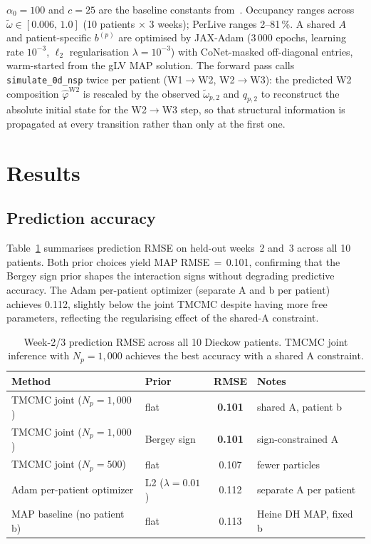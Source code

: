 \documentclass[11pt,a4paper]{article}
\begin{document}
$\alpha_0=100$ and $c=25$ are the baseline constants from~\cite{NishiokaTMCMC2025}.
Occupancy ranges across $\tilde\omega\in[0.006,\,1.0]$ (10 patients $\times$ 3 weeks); PerLive ranges 2--81\,\%.
A shared $A$ and patient-specific $b^{(p)}$ are optimised by JAX-Adam ($3\,000$ epochs, learning rate $10^{-3}$, $\ell_2$ regularisation $\lambda=10^{-3}$) with CoNet-masked off-diagonal entries, warm-started from the gLV MAP solution.
The forward pass calls \texttt{simulate\_0d\_nsp} twice per patient (W1$\to$W2, W2$\to$W3): the predicted W2 composition $\hat\varphi^{\mathrm{W2}}$ is rescaled by the observed $\tilde\omega_{p,2}$ and $q_{p,2}$ to reconstruct the absolute initial state for the W2$\to$W3 step, so that structural information is propagated at every transition rather than only at the first one.

\section{Results}
\label{sec:results}

\subsection{Prediction accuracy}

Table~\ref{tab:rmse} summarises prediction RMSE on held-out weeks~2 and~3 across all 10 patients.
Both prior choices yield MAP RMSE\,$=\,$0.101, confirming that the Bergey sign prior shapes the interaction signs without degrading predictive accuracy.
The Adam per-patient optimizer (separate A and b per patient) achieves 0.112, slightly below the joint TMCMC despite having more free parameters, reflecting the regularising effect of the shared-A constraint.

\begin{table}[htbp]
\centering\small
\begin{tabular}{@{}llcl@{}}
\toprule
\textbf{Method} & \textbf{Prior} & \textbf{RMSE} & \textbf{Notes}\\
\midrule
TMCMC joint ($N_p\!=\!1{,}000$) & flat   & \textbf{0.101} & shared A, patient b\\
TMCMC joint ($N_p\!=\!1{,}000$) & Bergey sign & \textbf{0.101} & sign-constrained A\\
TMCMC joint ($N_p\!=\!500$)  & flat   & 0.107 & fewer particles\\
Adam per-patient optimizer    & L2 ($\lambda=0.01$) & 0.112 & separate A per patient\\
MAP baseline (no patient b)   & flat   & 0.113 & Heine DH MAP, fixed b\\
\bottomrule
\end{tabular}
\caption{Week-2/3 prediction RMSE across all 10 Dieckow patients. TMCMC joint
inference with $N_p=1{,}000$ achieves the best accuracy with a shared A constraint.}
\label{tab:rmse}
\end{table}
\end{document}
